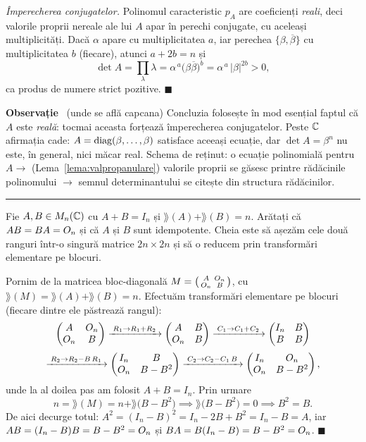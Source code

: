 \emph{Împerecherea conjugatelor.} Polinomul caracteristic $p_A$ are coeficienți \emph{reali}, deci valorile proprii nereale ale lui $A$ apar în perechi conjugate, cu aceleași multiplicități. Dacă $\alpha$ apare cu multiplicitatea $a$, iar perechea $\{\beta, \overline{\beta}\}$ cu multiplicitatea $b$ (fiecare), atunci $a + 2b = n$ și
\[
\det A = \prod_{\lambda} \lambda = \alpha^{\,a}\bigl(\beta\overline{\beta}\bigr)^{b} = \alpha^{\,a}\,|\beta|^{2b} > 0,
\]
ca produs de numere strict pozitive. $\blacksquare$

\smallskip
\noindent\textbf{Observație} \textperiodcentered\ (unde se află capcana) Concluzia folosește în mod esențial faptul că $A$ este \emph{reală}: tocmai aceasta forțează împerecherea conjugatelor. Peste $\mathbb{C}$ afirmația cade: $A = \operatorname{diag}(\beta, \dots, \beta)$ satisface aceeași ecuație, dar $\det A = \beta^n$ nu este, în general, nici măcar real. Schema de reținut: o ecuație polinomială pentru $A \to$ (Lema~\ref{lema:valpropanulare}) valorile proprii se găsesc printre rădăcinile polinomului $\to$ semnul determinantului se citește din structura rădăcinilor.
\vspace{1mm}\hrule

Fie $A,B \in M_n(\mathbb{C})$ cu $A+B = I_n$ și $\rang(A)+\rang(B) = n$. Arătați că
$AB = BA = O_n$ și că $A$ și $B$ sunt idempotente.
\sol Cheia este să așezăm cele două ranguri într-o singură matrice $2n \times 2n$ și să o reducem prin transformări elementare pe blocuri.

Pornim de la matricea bloc-diagonală $M = \begin{psmallmatrix} A & O_n \\ O_n & B \end{psmallmatrix}$, cu $\rang(M) = \rang(A)+\rang(B) = n$. Efectuăm transformări elementare pe blocuri (fiecare dintre ele păstrează rangul):
\[
\begin{pmatrix} A & O_n \\ O_n & B \end{pmatrix}
\xrightarrow{\;R_1 \to R_1 + R_2\;}
\begin{pmatrix} A & B \\ O_n & B \end{pmatrix}
\xrightarrow{\;C_1 \to C_1 + C_2\;}
\begin{pmatrix} I_n & B \\ B & B \end{pmatrix}
\]
\[
\xrightarrow{\;R_2 \to R_2 - B\,R_1\;}
\begin{pmatrix} I_n & B \\ O_n & B - B^2 \end{pmatrix}
\xrightarrow{\;C_2 \to C_2 - C_1\,B\;}
\begin{pmatrix} I_n & O_n \\ O_n & B - B^2 \end{pmatrix},
\]
unde la al doilea pas am folosit $A+B = I_n$. Prin urmare
\[
n = \rang(M) = n + \rang\bigl(B - B^2\bigr)
\implies \rang\bigl(B-B^2\bigr) = 0
\implies B^2 = B.
\]
De aici decurge totul: $A^2 = (I_n - B)^2 = I_n - 2B + B^2 = I_n - B = A$, iar $AB = (I_n - B)B = B - B^2 = O_n$ și $BA = B(I_n - B) = B - B^2 = O_n$. $\blacksquare$

